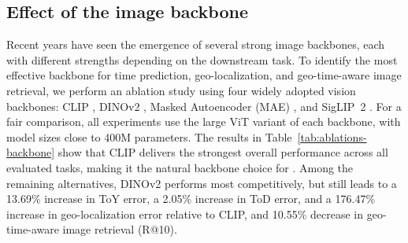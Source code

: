 \subsection{Effect of the image backbone}

Recent years have seen the emergence of several strong image backbones, each with different strengths depending on the downstream task. To identify the most effective backbone for time prediction, geo-localization, and geo-time-aware image retrieval, we perform an ablation study using four widely adopted vision backbones: CLIP \cite{clip}, DINOv2 \cite{oquab2023dinov2}, Masked Autoencoder (MAE) \cite{he2022masked}, and SigLIP~2 \cite{tschannen2025siglip}. For a fair comparison, all experiments use the large ViT variant of each backbone, with model sizes close to 400M parameters. The results in Table~\ref{tab:ablations-backbone} show that CLIP delivers the strongest overall performance across all evaluated tasks, making it the natural backbone choice for \tiger. Among the remaining alternatives, DINOv2 performs most competitively, but still leads to a 13.69\% increase in ToY error, a 2.05\% increase in ToD error, and a 176.47\% increase in geo-localization error relative to CLIP, and 10.55\% decrease in geo-time-aware image retrieval (R@10).

\begin{table}
    \centering
    \caption{\textbf{Effect of the image backbone.} 
    The pretrained CLIP \cite{clip} ViT backbone results in stronger overall performance compared to DINOv2 \cite{oquab2023dinov2}, Masked Autoencoder \cite{he2022masked}, and SigLIP 2 \cite{tschannen2025siglip}.
    We report time-of-year (ToY) and time-of-day (ToD) errors, geo-location error (km), and geo-time-aware image retrieval R@10, averaged over \textsc{TIGeR-test-86k} and CVT (lower is better for errors, higher is better for R@10).}
    \label{tab:ablations-backbone}
    
\end{table}

